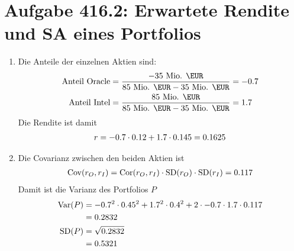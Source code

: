 \documentclass{article}
\DeclareMathOperator{\Var}{Var}
\DeclareMathOperator{\Cov}{Cov}
\DeclareMathOperator{\SD}{SD}
\DeclareMathOperator{\Cor}{Cor}
\begin{document}
	\section*{Aufgabe 416.2: Erwartete Rendite und SA eines Portfolios}
	\begin{enumerate}[label=(\alph*)]
		\item Die Anteile der einzelnen Aktien sind:
		\begin{align}
			\text{Anteil Oracle} &= \frac{-35\text{ Mio. \EUR}}{85\text{ Mio. \EUR} - 35\text{ Mio. \EUR}} = -0.7 \notag \\
			\text{Anteil Intel} &= \frac{85\text{ Mio. \EUR}}{85\text{ Mio. \EUR} - 35\text{ Mio. \EUR}} = 1.7 \notag
		\end{align}
		Die Rendite ist damit
		\begin{align}
			r = -0.7\cdot 0.12 + 1.7\cdot 0.145 = 0.1625 \notag
		\end{align}
		\item Die Covarianz zwischen den beiden Aktien ist
		\begin{align}
			\Cov(r_O, r_I) = \Cor(r_O,r_I)\cdot \SD(r_O)\cdot\SD(r_I) = 0.117 \notag
		\end{align}
		Damit ist die Varianz des Portfolios $P$
		\begin{align}
			\Var(P) &= -0.7^2\cdot 0.45^2 + 1.7^2\cdot 0.4^2 + 2\cdot -0.7\cdot 1.7\cdot 0.117 \notag \\
			&= 0.2832 \notag \\
			\SD(P) &= \sqrt{0.2832} \notag \\
			&= 0.5321 \notag
		\end{align}
	\end{enumerate}
	
\end{document}
